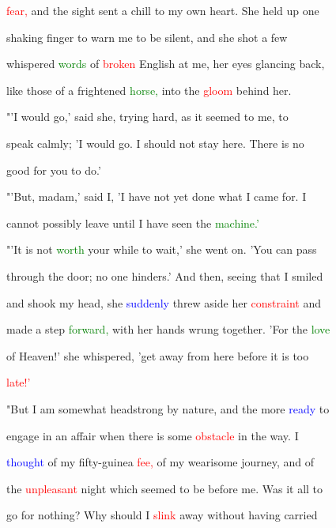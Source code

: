  \textcolor{red}{fear,} and the sight sent a chill to my own heart. She held up one

 shaking finger to \textcolor{BurntOrange}{warn} me to be silent, and she \textcolor{BurntOrange}{shot} a few

 whispered \textcolor{green}{words} of \textcolor{red}{broken} English at me, her eyes glancing back,

 like those of a \textcolor{BurntOrange}{frightened} \textcolor{green}{horse,} into the \textcolor{red}{gloom} behind her.



 "'I would go,' said she, trying hard, as it seemed to me, to

 speak calmly; 'I would go. I should not stay here. There is no

 \textcolor{BurntOrange}{good} for you to do.'



 "'But, madam,' said I, 'I have not yet done what I came for. I

 cannot possibly \textcolor{BurntOrange}{leave} until I have seen the \textcolor{green}{machine.'}



 "'It is not \textcolor{green}{worth} your while to \textcolor{BurntOrange}{wait,'} she went on. 'You can pass

 through the door; no one hinders.' And then, seeing that I \textcolor{BurntOrange}{smiled}

 and shook my head, she \textcolor{blue}{suddenly} threw aside her \textcolor{red}{constraint} and

 made a step \textcolor{green}{forward,} with her hands wrung together. 'For the \textcolor{green}{love}

 of Heaven!' she whispered, 'get away from here before it is too

 \textcolor{red}{late!'}



 "But I am somewhat headstrong by nature, and the more \textcolor{blue}{ready} to

 engage in an affair when there is some \textcolor{red}{obstacle} in the way. I

 \textcolor{blue}{thought} of my fifty-guinea \textcolor{red}{fee,} of my wearisome \textcolor{BurntOrange}{journey,} and of

 the \textcolor{red}{unpleasant} night which seemed to be before me. Was it all to

 go for nothing? Why should I \textcolor{red}{slink} away without having carried

